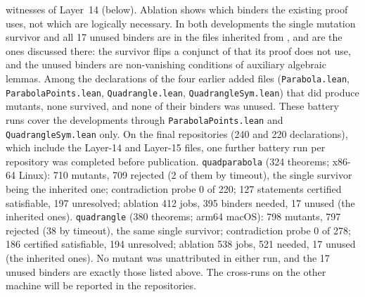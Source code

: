 \documentclass[11pt]{article}
\theoremstyle{definition}
\theoremstyle{remark}
\newcommand{\lean}[1]{\texttt{#1}}
\begin{document}
witnesses of Layer~14 (below). Ablation shows which binders the existing proof uses, not which are logically
necessary. In both developments the single mutation survivor and all 17 unused binders are in the files
inherited from \cite{paperE}, and are the ones discussed there: the survivor flips a conjunct of
 that its proof does not use, and the unused binders are
non-vanishing conditions of auxiliary algebraic lemmas. Among the declarations of the four earlier added files (\lean{Parabola.lean},
\lean{ParabolaPoints.lean}, \lean{Quadrangle.lean}, \lean{QuadrangleSym.lean}) that did produce mutants,
none survived, and none of their binders was unused. These battery runs cover the developments through
\lean{ParabolaPoints.lean} and \lean{QuadrangleSym.lean} only. On the final repositories (240 and 220
declarations), which include the Layer-14 and Layer-15 files, one further battery run per repository was
completed before publication. \lean{quadparabola} (324 theorems; x86-64 Linux): 710 mutants, 709 rejected (2 of them by timeout), the single survivor being the inherited one; contradiction probe 0 of 220; 127 statements certified satisfiable, 197 unresolved; ablation 412 jobs, 395 binders needed, 17 unused (the inherited ones). \lean{quadrangle} (380 theorems; arm64 macOS): 798 mutants, 797 rejected (38 by timeout), the same single survivor; contradiction probe 0 of 278; 186 certified satisfiable, 194 unresolved; ablation 538 jobs, 521 needed, 17 unused (the inherited ones). No mutant was unattributed in either run, and the 17 unused binders are exactly those listed above.
The cross-runs on the other machine will be reported in the repositories.
\end{document}
